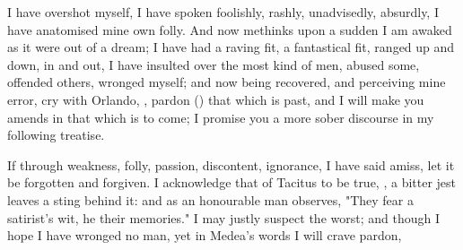 I have overshot myself, I have spoken foolishly, rashly, unadvisedly, absurdly,
I have anatomised mine own folly. And now methinks upon a sudden I am awaked as
it were out of a dream; I have had a raving fit, a fantastical fit, ranged up
and down, in and out, I have insulted over the most kind of men, abused some,
offended others, wronged myself; and now being recovered, and perceiving mine
error, cry with Orlando, , pardon () that which is past, and I will make you amends in that which is to come;
I promise you a more sober discourse in my following treatise.

If through weakness, folly, passion, discontent, ignorance,
I have said amiss, let it be forgotten and forgiven. I acknowledge that of
Tacitus to be true, , a bitter jest leaves a sting behind
it: and as an honourable man observes, "They fear a
satirist's wit, he their memories." I may justly suspect the worst; and though
I hope I have wronged no man, yet in Medea's words I will crave pardon,


